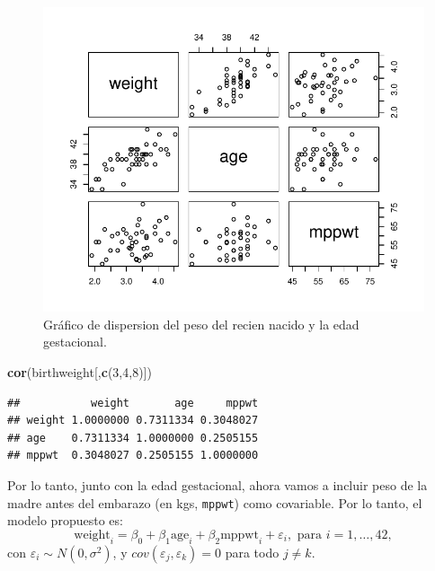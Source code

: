 \documentclass[
]{article}
\newenvironment{Shaded}{\begin{snugshade}}{\end{snugshade}}
\newcommand{\DecValTok}[1]{\textcolor[rgb]{0.00,0.00,0.81}{#1}}
\newcommand{\FunctionTok}[1]{\textcolor[rgb]{0.13,0.29,0.53}{\textbf{#1}}}
\newcommand{\NormalTok}[1]{#1}
\begin{document}
\begin{figure}

{\centering \includegraphics{MLG1_files/figure-latex/BWdataFig-1} 

}

\caption{Gráfico de dispersion del peso del recien nacido y la edad gestacional.}\label{fig:BWdataFig}
\end{figure}

\begin{Shaded}
\begin{Highlighting}[]
\FunctionTok{cor}\NormalTok{(birthweight[,}\FunctionTok{c}\NormalTok{(}\DecValTok{3}\NormalTok{,}\DecValTok{4}\NormalTok{,}\DecValTok{8}\NormalTok{)])}
\end{Highlighting}
\end{Shaded}

\begin{verbatim}
##           weight       age     mppwt
## weight 1.0000000 0.7311334 0.3048027
## age    0.7311334 1.0000000 0.2505155
## mppwt  0.3048027 0.2505155 1.0000000
\end{verbatim}

Por lo tanto, junto con la edad gestacional, ahora vamos a incluir peso de la madre antes del embarazo (en kgs, \texttt{mppwt}) como covariable. Por lo tanto, el modelo propuesto es:
\[
\mbox{weight}_{i} = \beta_{0} + \beta_{1}\mbox{age}_{i} + \beta_{2}\mbox{mppwt}_{i} + \varepsilon_{i}, \mbox{ para }i=1,\ldots,42,
\]
con \(\varepsilon_{i}\sim N(0,\sigma^{2})\), y \(cov(\varepsilon_{j},\varepsilon_{k})=0\) para todo \(j\neq k\).
\end{document}
